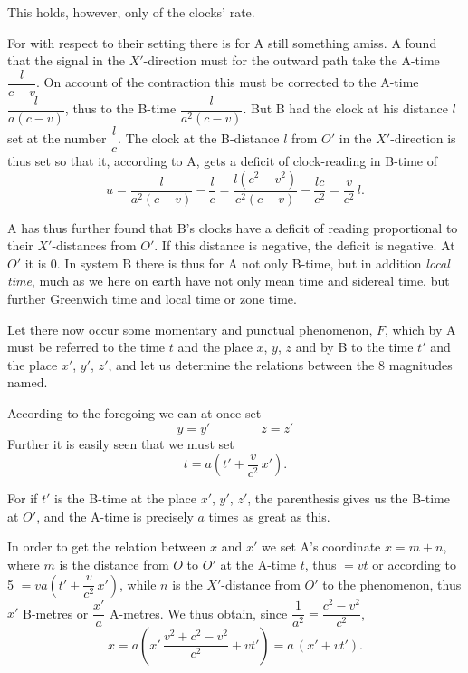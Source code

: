 \documentclass[12pt,a4paper]{article}
\begin{document}
This holds, however, only of the clocks' rate.

For with respect to their setting there is for A still something amiss. A
found that the signal in the $X'$-direction must for the outward path take the
A-time $\dfrac{l}{c-v}$. On account of the contraction this must be corrected
to the A-time $\dfrac{l}{a(c-v)}$, thus to the B-time
$\dfrac{l}{a^{2}(c-v)}$. But B had the clock at his distance $l$ set at the
number $\dfrac{l}{c}$. The clock at the B-distance $l$ from $O'$ in the
$X'$-direction is thus set so that it, according to A, gets a deficit of
clock-reading in B-time of
\begin{equation}\tag*{2.}
  u = \frac{l}{a^{2}(c-v)} - \frac{l}{c}
    = \frac{l(c^{2}-v^{2})}{c^{2}(c-v)} - \frac{lc}{c^{2}}
    = \frac{v}{c^{2}}\,l.
\end{equation}

A has thus further found that B's clocks have a deficit of reading
proportional to their $X'$-distances from $O'$. If this distance is negative,
the deficit is negative. At $O'$ it is 0. In system B there is thus for A not
only B-time, but in addition \emph{local time}, much as we here on earth have
not only mean time and sidereal time, but further Greenwich time and local
time or zone time.

Let there now occur some momentary and punctual phenomenon, $F$, which by A
must be referred to the time $t$ and the place $x$, $y$, $z$ and by B to the
time $t'$ and the place $x'$, $y'$, $z'$, and let us determine the relations
between the 8 magnitudes named.

According to the foregoing we can at once set
\begin{equation}\tag*{3.\quad 4.}
  y = y' \qquad\qquad z = z'
\end{equation}
Further it is easily seen that we must set
\begin{equation}\tag*{5.}
  t = a\left(t' + \frac{v}{c^{2}}\,x'\right).
\end{equation}

For if $t'$ is the B-time at the place $x'$, $y'$, $z'$, the parenthesis gives
us the B-time at $O'$, and the A-time is precisely $a$ times as great as this.

In order to get the relation between $x$ and $x'$ we set A's coordinate
$x = m + n$, where $m$ is the distance from $O$ to $O'$ at the A-time $t$,
thus $= vt$ or according to 5
$= va\left(t' + \dfrac{v}{c^{2}}\,x'\right)$, while $n$ is the
$X'$-distance from $O'$ to the phenomenon, thus $x'$ B-metres or
$\dfrac{x'}{a}$ A-metres. We thus obtain, since
$\dfrac{1}{a^{2}} = \dfrac{c^{2}-v^{2}}{c^{2}}$,
\begin{equation}\tag*{6.}
  x = a\left(x'\,\frac{v^{2}+c^{2}-v^{2}}{c^{2}} + vt'\right)
    = a\,(x' + vt').
\end{equation}
\end{document}
